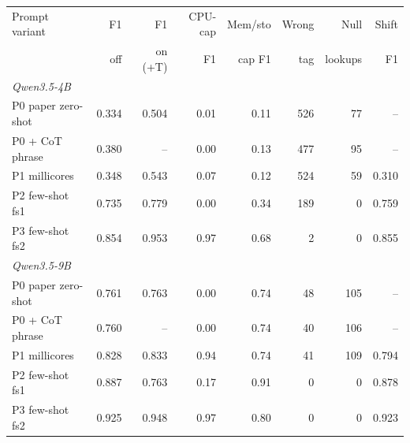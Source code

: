 \begin{tabular}{lrrrrrrr}
\toprule
Prompt variant & F1 & F1 & CPU-cap & Mem/sto & Wrong & Null & Shift \\
 & off & on (+T) & F1 & cap F1 & tag & lookups & F1 \\
\midrule
\multicolumn{8}{l}{\textit{Qwen3.5-4B}} \\
P0 paper zero-shot & 0.334 & 0.504 & 0.01 & 0.11 & 526 & 77 & -- \\
P0 + CoT phrase & 0.380 & -- & 0.00 & 0.13 & 477 & 95 & -- \\
P1 millicores & 0.348 & 0.543 & 0.07 & 0.12 & 524 & 59 & 0.310 \\
P2 few-shot fs1 & 0.735 & 0.779 & 0.00 & 0.34 & 189 & 0 & 0.759 \\
P3 few-shot fs2 & 0.854 & 0.953 & 0.97 & 0.68 & 2 & 0 & 0.855 \\
\midrule
\multicolumn{8}{l}{\textit{Qwen3.5-9B}} \\
P0 paper zero-shot & 0.761 & 0.763 & 0.00 & 0.74 & 48 & 105 & -- \\
P0 + CoT phrase & 0.760 & -- & 0.00 & 0.74 & 40 & 106 & -- \\
P1 millicores & 0.828 & 0.833 & 0.94 & 0.74 & 41 & 109 & 0.794 \\
P2 few-shot fs1 & 0.887 & 0.763 & 0.17 & 0.91 & 0 & 0 & 0.878 \\
P3 few-shot fs2 & 0.925 & 0.948 & 0.97 & 0.80 & 0 & 0 & 0.923 \\
\bottomrule
\end{tabular}
